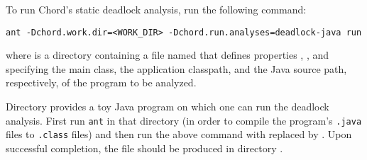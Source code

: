 To run Chord's static deadlock analysis, run the following command:

\begin{framed}
\begin{verbatim}
ant -Dchord.work.dir=<WORK_DIR> -Dchord.run.analyses=deadlock-java run
\end{verbatim}
\end{framed}

where  is a directory containing a file named
 that defines properties ,
, and  specifying the main class,
the application classpath, and the Java source path, respectively, of the
program to be analyzed.

Directory  provides a toy Java
program on which one can run the deadlock analysis.  First run {\tt ant} in that
directory (in order to compile the program's {\tt .java} files to {\tt .class}
files) and then run the above command with  replaced by
.  Upon successful completion, the file
 should be produced in directory
.

